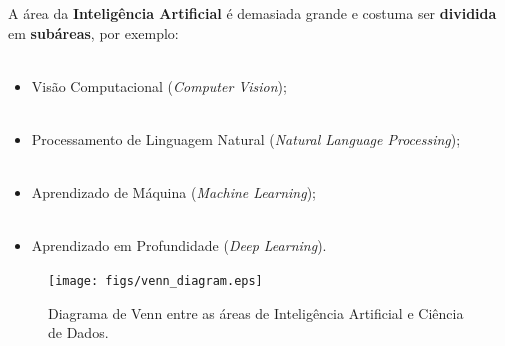 \begin{frame}
	\justifying
	A área da \textbf{Inteligência Artificial} é demasiada grande e costuma ser \textbf{dividida} em \textbf{subáreas}, por exemplo:
	\\~\\
	\begin{itemize}
		\justifying
		\item Visão Computacional (\emph{Computer Vision});
		\\~\\
		\item Processamento de Linguagem Natural (\emph{Natural Language Processing});
		\\~\\
		\item Aprendizado de Máquina (\emph{Machine Learning});
		\\~\\
		\item Aprendizado em Profundidade (\emph{Deep Learning}).	
	\end{itemize}
\end{frame}

\begin{frame}
	\begin{figure}[!ht]
		\centering
		\texttt{[image: figs/venn\_diagram.eps]}	
		\label{f.venn_diagram}
		\caption{Diagrama de Venn entre as áreas de Inteligência Artificial e Ciência de Dados.}
	\end{figure}
\end{frame}